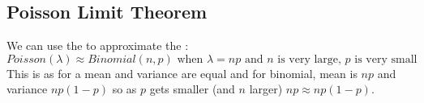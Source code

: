 \documentclass{report}
\begin{document}
\subsection*{Poisson Limit Theorem}
We can use the  to approximate the :
\[Poisson(\lambda) \approx Binomial(n,p) \text{ when } \lambda = np \text{ and } n \text{ is very large, } p \text{ is very small}\]
This is as for a  mean and variance are equal and for binomial, mean is $np$ and variance $np(1-p)$ so as $p$ gets smaller (and $n$ larger) $np \approx np(1-p)$.
\end{document}

